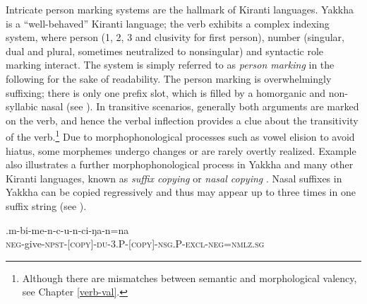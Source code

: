 Intricate person marking systems are the hallmark of Kiranti languages. Yakkha is a “well-behaved” Kiranti language; the verb exhibits a complex indexing system, where person (1, 2, 3 and clusivity for first person), number (singular, dual and plural, sometimes neutralized to nonsingular) and syntactic role marking interact. The system is simply referred to as \emph{person marking} in the following for the sake of readability. The person marking  is overwhelmingly suffixing; there is only one prefix slot, which is filled by a homorganic  and non-syllabic nasal (see \Next). In transitive scenarios, generally both arguments are marked on the verb, and hence the verbal inflection provides a clue about the transitivity of the verb.\footnote{Although there are mismatches between semantic and morphological valency, see Chapter \ref{verb-val}.} Due to morphophonological processes such as vowel elision to avoid hiatus, some morphemes undergo changes or are rarely overtly realized. Example \Next also illustrates a further morphophonological process in Yakkha and many other Kiranti languages, known as \emph{suffix copying} or \emph{nasal copying} \citep{Bickel2003Belhare, Doornenbal2009A-grammar, Ebert2003Kiranti, Schikowski2012_Morphology}. Nasal suffixes in Yakkha  can be copied regressively and thus may appear up to three times in one suffix string (see ).


\exg.m-bi-me-n-c-u-n-ci-ŋa-n=na\\
{\scshape neg-}give{\scshape -npst-[copy]-du-3.P-[copy]-nsg.P-excl-neg=nmlz.sg}\\


